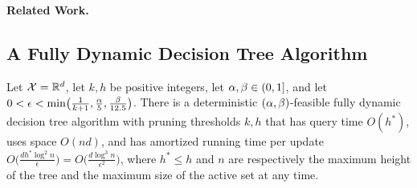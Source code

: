 \noindent\textbf{Related Work.} 





\subsection{A Fully Dynamic Decision Tree Algorithm}\label{sec:dyn}


\begin{theorem}\label{thm:main_UB}
Let $\mathcal{X}=\mathbb{R}^d$, let $k,h$ be positive integers, let $\alpha,\beta \in (0,1]$, and let $0 < \epsilon < \min\!\big(\frac{1}{k+1},\frac{\alpha}{5},\frac{\beta}{12.5}\big)$. There is a deterministic $(\alpha,\beta)$-feasible fully dynamic decision tree algorithm with pruning thresholds $k,h$ that has query time $O(h^*)$, uses space $O(nd)$, and has amortized running time per update $O\big(\frac{d h^{\!*} \log^2 n}{ \epsilon}\big) = O\big(\frac{d \log^3 n}{\epsilon^2}\big)$, where $h^*\le h$ and $n$ are respectively the maximum height of the tree and the maximum size of the active set at any time.
\end{theorem}


